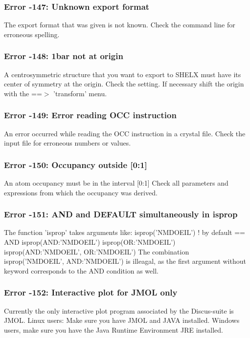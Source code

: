 \subsubsection{Error -147: Unknown export format}
\par
The export format that was given is not known. 
Check the command line for erroneous spelling. 
\subsubsection{Error -148: 1bar not at origin}
\par
A centrosymmetric structure that you want to export to SHELX 
must have its center of symmetry at the origin. 
Check the setting. If necessary shift the origin with the 
==$> $ 'transform' menu. 
\par
\subsubsection{Error -149: Error reading OCC instruction}
\par
An error occurred while reading the OCC instruction in 
a crystal file. Check the input file for erroneous numbers 
or values. 
\subsubsection{Error -150: Occupancy outside [0:1]}
\par
An atom occupancy must be in the interval [0:1] 
Check all parameters and expressions from which the 
occupancy was derived. 
\subsubsection{Error -151: AND and DEFAULT simultaneously in isprop}
\par
The function 'isprop' takes arguments like: 
isprop('NMDOEIL')         ! by default == AND 
isprop(AND:'NMDOEIL') 
isprop(OR:'NMDOEIL') 
isprop(AND:'NMDOEIL', OR:'NMDOEIL') 
The combination 
isprop('NMDOEIL', AND:'NMDOEIL') 
is illeagal, as the first argument without keyword 
corresponds to the AND condition as well. 
\subsubsection{Error -152: Interactive plot for JMOL only}
\par
Currently the only interactive plot program 
associated by the Discus-suite is JMOL. 
Linux users: Make sure you have JMOL and JAVA 
installed. 
Windows users, make sure you have the Java Runtime 
Environment JRE installed. 

